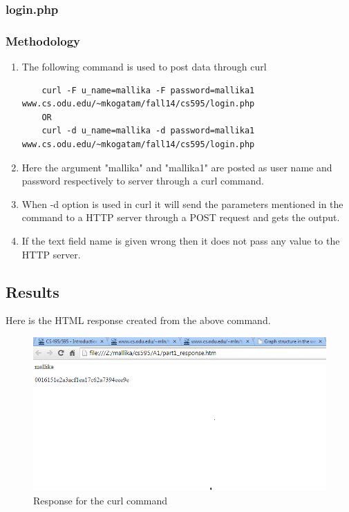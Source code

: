 \subsubsection{login.php}

\subsubsection{Methodology }
\begin{enumerate}
\item  The following command is used to post data through curl
\begin{verbatim}
	curl -F u_name=mallika -F password=mallika1 www.cs.odu.edu/~mkogatam/fall14/cs595/login.php
	OR
	curl -d u_name=mallika -d password=mallika1 www.cs.odu.edu/~mkogatam/fall14/cs595/login.php
\end{verbatim}
\item Here the argument "mallika" and "mallika1" are posted as user name and password respectively to server through a curl command. 
\item When -d option is used in curl it will send the parameters mentioned in the command to a HTTP server through a POST request and gets the output. 
\item If the text field name is given wrong then it does not pass any value to the HTTP server. 
\end{enumerate}
\newpage
\subsection{Results}

Here is the HTML response created from the above command. 



\begin{figure}[ht]    
    \begin{center}
        \includegraphics[scale=0.60]{part1_response.png}
        \caption{Response for the curl command}
        \label{fig:X-distribution}
    \end{center}
\end{figure}